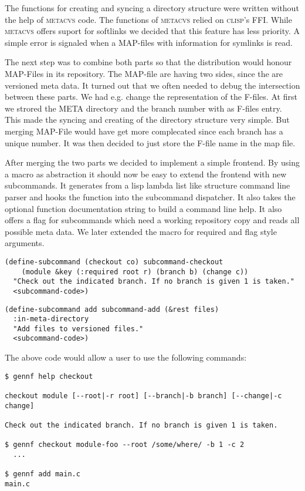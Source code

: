 \documentclass[fleqn, 10pt, a4paper]{report} \usepackage{amssymb}
\begin{document}
The functions for creating and syncing a directory structure were
written without the help of \textsc{metacvs} code. The functions of
\textsc{metacvs} relied on \textsc{clisp}'s FFI. While
\textsc{metacvs} offers suport for softlinks we decided that this
feature has less priority. A simple error is signaled when a
MAP-files with information for symlinks is read.

The next step was to combine both parts so that the distribution would
honour MAP-Files in its repository. The MAP-file are having two sides,
since the are versioned meta data. It turned out that we often needed
to debug the intersection between these parts. We had e.g. change the
representation of the F-files. At first we strored the META directory
and the branch number with as F-files entry. This made the syncing and
creating of the directory structure very simple. But merging MAP-File
would have get more complecated since each branch has a unique number.
It was then decided to just store the F-file name in the map file.

After merging the two parts we decided to implement a simple frontend.
By using a macro as abstraction it should now be easy to extend the
frontend with new subcommands. It generates from a lisp lambda list
like structure command line parser and hooks the function into the
subcommand dispatcher. It also takes the optional function
documentation string to build a command line help. It also offers a
flag for subcommands which need a working repository copy and reads
all possible meta data. We later extended the macro for required and
flag style arguments.

\begin{verbatim}
(define-subcommand (checkout co) subcommand-checkout
    (module &key (:required root r) (branch b) (change c))
  "Check out the indicated branch. If no branch is given 1 is taken."
  <subcommand-code>)
\end{verbatim}

\begin{verbatim}
(define-subcommand add subcommand-add (&rest files)
  :in-meta-directory
  "Add files to versioned files."
  <subcommand-code>)
\end{verbatim}

The above code would allow a user to use the following commands:

\begin{verbatim}
$ gennf help checkout

checkout module [--root|-r root] [--branch|-b branch] [--change|-c change]

Check out the indicated branch. If no branch is given 1 is taken.

$ gennf checkout module-foo --root /some/where/ -b 1 -c 2 
  ...

$ gennf add main.c
main.c
\end{verbatim}
\end{document}
